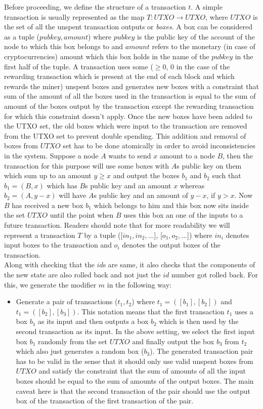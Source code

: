 \begin{enumerate}[\IEEEsetlabelwidth{Z}]
\begin{itemize}[]
Before proceeding, we define the structure of a transaction $t$. A simple transaction is usually represented as the map $T : UTXO \to UTXO$, where $UTXO$ is the set of all the unspent transaction outputs or \textit{boxes}. A box can be considered as a tuple ($pubkey, amount$) where $pubkey$ is the public key of the account of the node to which this box belongs to and $amount$ refers to the monetary (in case of cryptocurrencies) amount which this box holds in the name of the $pubkey$ in the first half of the tuple. A transaction uses some ($\geq 0$, 0 in the case of the rewarding transaction which is present at the end of each block and which rewards the miner) unspent boxes and generates new boxes with a constraint that sum of the amount of all the boxes used in the transaction is equal to the sum of amount of the boxes output by the transaction except the rewarding transaction for which this constraint doesn't apply. Once the new boxes have been added to the UTXO set, the old boxes which were input to the transaction are removed from the UTXO set to prevent double spending. This addition and removal of boxes from $UTXO$ set has to be done atomically in order to avoid inconsistencies in the system. Suppose a node $A$ wants to send $x$ amount to a node $B$, then the transaction for this purpose will use some boxes with $A$s public key on them which sum up to an amount $y \geq x$ and output the boxes $b_1$ and $b_2$ such that $b_1 = (B, x)$ which has $B$s public key and an amount $x$ whereas $b_2 = (A, y-x)$ will have $A$s public key and an amount of $y-x$, if $y>x$. Now $B$ has received a new box $b_1$ which belongs to him and this box now sits inside the set $UTXO$ until the point when $B$ uses this box an one of the inputs to a future transaction. Readers should note that for more readability we will represent a transaction $T$ by a tuple ([$in_1, in_2, ...$], [$o_1, o_2, ...$]) where $in_i$ denotes input boxes to the transaction and $o_i$ denotes the output boxes of the transaction.\\
Along with checking that the $id$s are same, it also checks that the components of the new state are also rolled back and not just the $id$ number got rolled back. For this, we generate the modifier $m$ in the following way:
\begin{itemize}
\item Generate a pair of transactions ($t_1, t_2$) where $t_1 = ([b_{1}], [b_{2}])$ and $t_1 = ([b_{2}], [b_{3}])$. This notation means that the first transaction $t_1$ uses a box $b_1$ as its input and then outputs a box $b_2$ which is then used by the second transaction as its input. In the above setting, we select the first input box $b_1$ randomly from the set $UTXO$ and finally output the box $b_3$ from $t_2$ which also just generates a random box ($b_3$). The generated transaction pair has to be valid in the sense that it should only use valid unspent boxes from $UTXO$ and satisfy the constraint that the sum of amounts of all the input boxes should be equal to the sum of amounts of the output boxes. The main caveat here is that the second transaction of the pair should use the output box of the transaction of the first transaction of the pair.

\end{itemize}
\end{itemize}
\end{enumerate}
